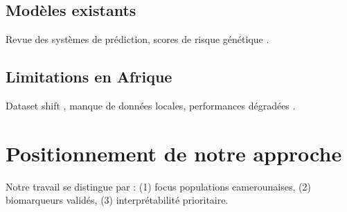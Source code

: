 \subsection{Modèles existants}
Revue des systèmes de prédiction, scores de risque génétique \cite{Contreras2018}.

\subsection{Limitations en Afrique}
Dataset shift \cite{Quinonero-Candela2009}, manque de données locales, performances dégradées \cite{Oram2025}.

\section{Positionnement de notre approche}
Notre travail se distingue par : (1) focus populations camerounaises, (2) biomarqueurs validés, (3) interprétabilité prioritaire.
